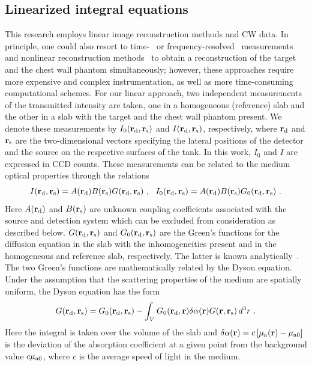 \subsection{Linearized integral equations}
\label{subsec:lin_eq}

This research employs linear image reconstruction methods and CW data. In principle, one could also resort to
time-~\cite{patterson_89_1,benaron_93_1,andersson-engels_90_1,jacques_89_1,schmidt_00_2,ntziachristos_98_1}
or frequency-resolved~\cite{gratton_90_1,fishkin_93_1,chance_98_1,pogue_94_1} measurements and nonlinear reconstruction methods~\cite{arridge_99_1,markel_03_2} to obtain a reconstruction of
the target and the chest wall phantom simultaneously; however, these
approaches require more expensive and complex instrumentation, as well
as more time-consuming computational schemes. For our linear approach,
two independent measurements of the transmitted intensity are taken,
one in a homogeneous (reference) slab and the other in a slab with the
target and the chest wall phantom present. We denote these
measurements by $I_0({\bf r}_{\rm d}, {\bf r}_{\rm s})$ and $I({\bf
  r}_{\rm d}, {\bf r}_{\rm s})$, respectively, where ${\bf r}_{\rm d}$
and ${\bf r}_{\rm s}$ are the two-dimensional vectors specifying the
lateral positions of the detector and the source on the respective
surfaces of the tank. In this work, $I_0$ and $I$ are expressed in CCD
counts. These measurements can be related to the medium optical
properties through the relations
%
\begin{equation}
I({\bf r}_{\rm d}, {\bf r}_{\rm s}) =
A({\bf r}_{\rm d})B({\bf r}_{\rm s})G({\bf r}_{\rm d},{\bf r}_{\rm s})
\ , \ \ 
I_0({\bf r}_{\rm d},{\bf r}_{\rm s})=
A({\bf r}_{\rm d})B({\bf r}_{\rm s})G_0({\bf r}_{\rm d},{\bf r}_{\rm
  s}) \ .
\label{eq1}
\end{equation}
%
\noindent
Here $A({\bf r}_{\rm d})$ and $B({\bf r}_{\rm s})$ are unknown
coupling coefficients associated with the source and detection system
which can be excluded from consideration as described below. $G({\bf
  r}_{\rm d}, {\bf r}_{\rm s})$ and $G_0({\bf r}_{\rm d}, {\bf r}_{\rm
  s})$ are the Green's functions for the diffusion equation in the
slab with the inhomogeneities present and in the homogeneous and reference 
slab, respectively. The latter is known
analytically~\cite{markel_04_4}. The two Green's functions are
mathematically related by the Dyson equation. Under the assumption
that the scattering properties of the medium are spatially uniform,
the Dyson equation has the form
%
\begin{equation}
G({\bf r}_{\rm d}, {\bf r}_{\rm s}) = G_0({\bf r}_{\rm d}, {\bf r}_{\rm s}) -
\int_V G_0({\bf r}_{\rm d}, {\bf r}) \delta\alpha({\bf r}) G({\bf r},
{\bf r}_{\rm s})\,d^3r \ .
\label{eq2}
\end{equation}
%
\noindent
Here the integral is taken over the volume of the slab and
$\delta\alpha({\bf r}) = c\left[\mu_{\rm a}({\bf r}) - \mu_{{\rm a}0}
\right]$ is the deviation of the absorption coefficient at a given
point from the background value $c\mu_{{\rm a}0}$, where $c$ is the
average speed of light in the medium.

